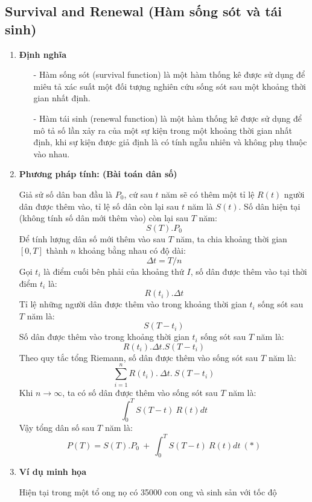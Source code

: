 \documentclass[12pt,a4paper]{article}
\begin{document}
\subsection{Survival and Renewal (Hàm sống sót và tái sinh)}
\begin{enumerate}[a/]
    \item \textbf{Định nghĩa}
        \begin{itemize}
            \item[-] Hàm sống sót (survival function) là một hàm thống kê được sử dụng để miêu tả xác suất một đối tượng nghiên cứu sống sót sau một khoảng thời gian nhất định.
            \item[-] Hàm tái sinh (renewal function) là một hàm thống kê được sử dụng để mô tả số lần xảy ra của một sự kiện trong một khoảng thời gian nhất định, khi sự kiện được giả định là có tính ngẫu nhiên và không phụ thuộc vào nhau.
        \end{itemize}
    \item \textbf{Phương pháp tính: (Bài toán dân số)}
        \begin{flushleft}
            Giả sử số dân ban đầu là $P_0$, cứ sau $t$ năm sẽ có thêm một tỉ lệ $R(t)$ người dân được thêm vào, tỉ lệ số dân còn lại sau $t$ năm là $S(t)$. 
            Số dân hiện tại (không tính số dân mới thêm vào) còn lại sau $T$ năm:
            $$S(T).P_0$$
            Để tính lượng dân số mới thêm vào sau $T$ năm, ta chia khoảng thời gian $\left[0,T\right]$ thành $n$ khoảng bằng nhau có độ dài:
            $$\Delta t=T/n$$
            Gọi $t_i$ là điểm cuối bên phải của khoảng thứ $I$, số dân được thêm vào tại thời điểm $t_i$ là:
            $$R(t_i).\Delta t$$
            Tỉ lệ những người dân được thêm vào trong khoảng thời gian $t_i$ sống sót sau $T$ năm là:
            $$S(T-t_i)$$
            Số dân được thêm vào trong khoảng thời gian $t_i$ sống sót sau $T$ năm là:
            $$R(t_i).\Delta t.S(T-t_i)$$
            Theo quy tắc tổng Riemann, số dân được thêm vào sống sót sau $T$ năm là:
            $$\sum_{i=1}^{n}R(t_i).\ \Delta t.\ S(T-t_i)$$
            Khi $n \to \infty$, ta có số dân được thêm vào sống sót sau $T$ năm là:
            $$\int_{0}^{T}S(T-t)\ R(t)dt$$
            Vậy tổng dân số sau $T$ năm là:
            $$P(T)=S(T).P_0\ +\ \int_{0}^{T}S(T-t)\ R(t)dt\ (*)$$
        \end{flushleft}
    \newpage
    \item \textbf{Ví dụ minh họa}
        \begin{flushleft}
            Hiện tại trong một tổ ong nọ có 35000 con ong và sinh sản với tốc độ 

\end{flushleft}
\end{enumerate}
\end{document}
